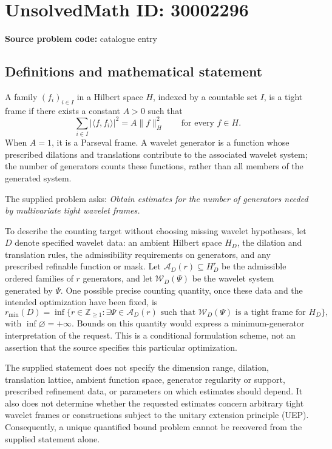 \documentclass[11pt]{article}
\begin{document}
\section*{UnsolvedMath ID: 30002296}
\textbf{Source problem code:} catalogue entry
\subsection{Definitions and mathematical statement}
A family \((f_i)_{i\in I}\) in a Hilbert space \(H\), indexed by a countable set \(I\), is a tight frame if there exists a constant \(A>0\) such that
\[
\sum_{i\in I}|\langle f,f_i\rangle|^2=A\|f\|_H^2
\qquad\text{for every }f\in H.
\]
When \(A=1\), it is a Parseval frame. A wavelet generator is a function whose prescribed dilations and translations contribute to the associated wavelet system; the number of generators counts these functions, rather than all members of the generated system.

The supplied problem asks: \emph{Obtain estimates for the number of generators needed by multivariate tight wavelet frames.}

To describe the counting target without choosing missing wavelet hypotheses, let \(D\) denote specified wavelet data: an ambient Hilbert space \(H_D\), the dilation and translation rules, the admissibility requirements on generators, and any prescribed refinable function or mask. Let \(\mathcal A_D(r)\subseteq H_D^r\) be the admissible ordered families of \(r\) generators, and let \(\mathcal W_D(\Psi)\) be the wavelet system generated by \(\Psi\). One possible precise counting quantity, once these data and the intended optimization have been fixed, is
\[
r_{\min}(D)=\inf\bigl\{r\in\mathbb Z_{\geq1}:\exists\Psi\in\mathcal A_D(r)\text{ such that }\mathcal W_D(\Psi)\text{ is a tight frame for }H_D\bigr\},
\]
with \(\inf\varnothing=+\infty\). Bounds on this quantity would express a minimum-generator interpretation of the request. This is a conditional formulation scheme, not an assertion that the source specifies this particular optimization.

The supplied statement does not specify the dimension range, dilation, translation lattice, ambient function space, generator regularity or support, prescribed refinement data, or parameters on which estimates should depend. It also does not determine whether the requested estimates concern arbitrary tight wavelet frames or constructions subject to the unitary extension principle (UEP). Consequently, a unique quantified bound problem cannot be recovered from the supplied statement alone.
\end{document}
